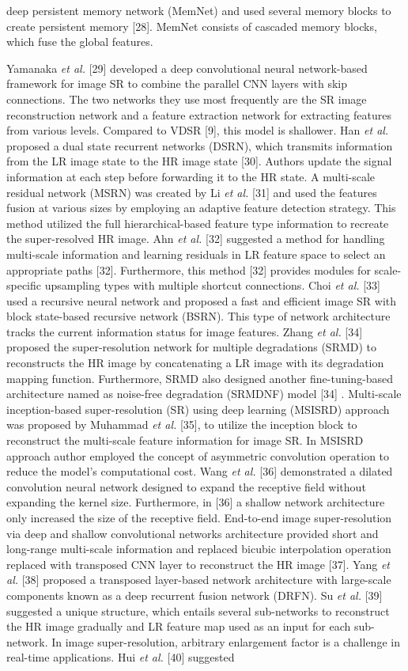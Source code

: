 \documentclass{ieeeaccess}
\begin{document}
deep persistent memory network (MemNet) and used several memory blocks to create persistent memory [28]. MemNet consists of cascaded memory blocks, which fuse the global features.

Yamanaka \textit{et al.} [29] developed a deep convolutional neural network-based framework for image SR to combine the parallel CNN layers with skip connections. The two networks they use most frequently are the SR image reconstruction network and a feature extraction network for extracting features from various levels. Compared to VDSR [9], this model is shallower. Han \textit{et al.} proposed a dual state recurrent networks (DSRN), which transmits information from the LR image state to the HR image state [30]. Authors update the signal information at each step before forwarding it to the HR state. A multi-scale residual network (MSRN) was created by Li \textit{et al.} [31]  and used the features fusion at various sizes by employing an adaptive feature detection strategy. This method utilized the full hierarchical-based feature type information to recreate the super-resolved HR image. Ahn  \textit{et al.} [32] suggested a method  for handling multi-scale information and learning residuals in LR feature space to select an appropriate paths [32]. Furthermore, this method [32] provides modules for scale-specific upsampling types with multiple shortcut connections. Choi  \textit{et al.} [33] used a recursive neural network and proposed a fast and efficient image SR with block state-based recursive network (BSRN). This type of network architecture tracks the current information status for image features. Zhang  \textit{et al.} [34] proposed the super-resolution network for multiple degradations (SRMD) to reconstructs the HR image by concatenating a LR image with its degradation mapping function. Furthermore, SRMD also designed another fine-tuning-based architecture named as noise-free degradation (SRMDNF) model [34] . Multi-scale inception-based super-resolution (SR) using deep learning (MSISRD) approach was proposed by Muhammad \textit{et al.} [35], to utilize the inception block to reconstruct the multi-scale feature information for image SR. In MSISRD approach author employed the concept of asymmetric convolution operation to reduce the model's computational cost. Wang  \textit{et al.} [36] demonstrated a dilated convolution neural network designed to expand the receptive field without expanding the kernel size. Furthermore, in [36] a shallow network architecture only increased the size of the receptive field. End-to-end image super-resolution via deep and shallow convolutional networks architecture provided short and long-range multi-scale information and replaced bicubic interpolation operation replaced with transposed CNN layer to reconstruct the HR image [37]. Yang  \textit{et al.} [38] proposed a transposed layer-based network architecture with large-scale components known as a deep recurrent fusion network (DRFN). Su \textit{et al.} [39] suggested a unique structure, which entails several sub-networks to reconstruct the HR image gradually and LR feature map used as an input for each sub-network. In image super-resolution, arbitrary enlargement factor is a challenge in real-time applications. Hui  \textit{et al.} [40] suggested 
\end{document}

